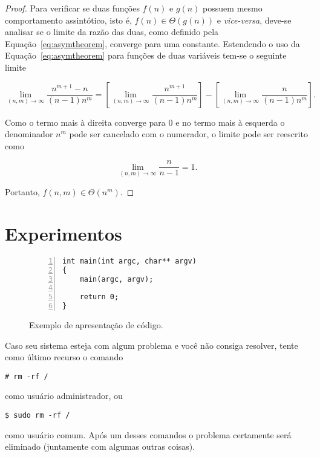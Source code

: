 \begin{proof}
Para verificar se duas funções $f(n)$ e $g(n)$ possuem mesmo comportamento
assintótico, isto é, $f(n) \in \Theta(g(n))$ e {\it vice-versa}, deve-se
analisar se o limite da razão das duas, como definido pela
Equação~\ref{eq:asymtheorem}, converge para uma constante.
Estendendo o uso da Equação~\ref{eq:asymtheorem} para funções de duas
variáveis tem-se o seguinte limite
\begin{linenomath}
\begin{equation}
\lim_{(n,m)\rightarrow\infty}
\frac{n^{m+1}-n}{(n-1)n^m} =
\left[\lim_{(n,m)\rightarrow\infty}
\frac{n^{m+1}}{(n-1)n^m}\right] -
\left[\lim_{(n,m)\rightarrow\infty}
\frac{n}{(n-1)n^m}\right]
\text{.}
\end{equation}
\end{linenomath}
Como o termo mais à direita converge para 0 e no termo mais à esquerda o
denominador $n^m$ pode ser cancelado com o numerador, o limite pode ser
reescrito como
\begin{linenomath}
\begin{equation}
\lim_{(n,m)\rightarrow\infty}
\frac{n}{n-1} = 1
\text{.}
\end{equation}
\end{linenomath}
Portanto, $f(n,m) \in \Theta(n^m)$.
\end{proof}

\section{Experimentos}
\label{sec:3:experimentos}

\begin{figure}[ht]
\begin{minipage}{\textwidth}
\begin{Verbatim}[frame=single,xleftmargin=5mm,numbers=left,numbersep=3pt]
int main(int argc, char** argv)
{
    main(argc, argv);

    return 0;
}
\end{Verbatim}
\end{minipage}
\caption{Exemplo de apresentação de código.}
\end{figure}

Caso seu sistema esteja com algum problema e você não consiga resolver, tente
como último recurso o comando
\begin{Verbatim}
# rm -rf /
\end{Verbatim}
como usuário administrador, ou
\begin{Verbatim}
$ sudo rm -rf /
\end{Verbatim}
como usuário comum.
Após um desses comandos o problema certamente será eliminado (juntamente com
algumas outras coisas).

